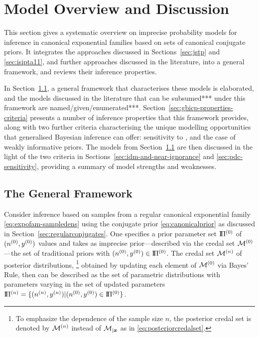 


\section{Model Overview and Discussion}
\label{sec:generalmodel}


This section gives a systematic overview on imprecise probability models
for inference in canonical exponential families
based on sets of canonical conjugate priors.
It integrates the approaches discussed in Sections~\ref{sec:jstp} and \ref{sec:isipta11},
and further approaches discussed in the literature, into a general framework,
and reviews their inference properties.

\medskip

In Section~\ref{sec:basicsetting}, a general framework that characterises these models is elaborated,
and the models discussed in the literature that can be subsumed*** under this framework are named/given/enumerated***.
%
Section~\ref{sec:gbicp-properties-criteria} presents a number of inference properties that this framework provides,
along with two further criteria characterising the unique modelling opportunities that
generalised Bayesian inference can offer: sensitivity to \pdc, and the case of weakly informative priors.
%
The models from Section~\ref{sec:basicsetting} are then discussed in the light of the two criteria in
Sections~\ref{sec:idm-and-near-ignorance} and \ref{sec:pdc-sensitivity},
providing a summary of model strengths and weaknesses.


\subsection{The General Framework}
\label{sec:basicsetting}

Consider inference based on samples from a regular canonical exponential family \eqref{eq:expofam-sampledens}
using the conjugate prior \eqref{eq:canonicalprior} as discussed in Section~\ref{sec:regularconjugates}.
One specifies a prior parameter set $\text{I}\!\Pi^{(0)}$ of $(n^{(0)},y^{(0)})$ values
and takes as imprecise prior---described via the credal set $\mathcal{M}^{(0)}$---the set of traditional priors with $(n^{(0)}, y^{(0)}) \in \text{I}\!\Pi^{(0)}$.
The credal set $\mathcal{M}^{(n)}$ of posterior distributions,%
\footnote{To emphasize the dependence of the sample size $n$,
the posterior credal set is denoted by $\mathcal{M}^{(n)}$ instead of $\mathcal{M}_{\vert {\bm x}}$ as in \eqref{eq:posteriorcredalset}.}
obtained by updating each element of $\mathcal{M}^{(0)}$ via Bayes' Rule,
then can be described as the set of parametric distributions
with parameters varying in the set of updated parameters $\text{I}\!\Pi^{(n)} = \{(n^{(n)},y^{(n)}) \vert (n^{(0)}, y^{(0)}) \in \text{I}\!\Pi^{(0)}\}$.

